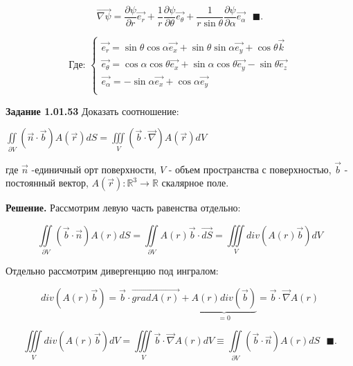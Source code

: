 \documentclass[a4paper, 12pt]{article}
\begin{document}
	\begin{equation}
		\vec{\nabla \psi} = \dfrac{\partial\psi}{\partial r}\vec{e_r} + \dfrac{1}{r}\dfrac{\partial\psi}{\partial\theta}\vec{e_\theta} + \dfrac{1}{r\sin\theta}\dfrac{\partial\psi}{\partial\alpha}\vec{e_\alpha} \text{ } \blacksquare.
	\end{equation}
	
	\begin{equation}
		\text{Где: } \begin{cases}
			\vec{e_r} = \sin\theta\cos\alpha \vec{e_x} + \sin\theta\sin\alpha\vec{e_y} + \cos\theta\vec{k} \\
			\vec{e_\theta} = \cos\alpha\cos\theta\vec{e_x} + \sin\alpha\cos\theta\vec{e_y} -\sin\theta\vec{e_z} \\
			\vec{e_\alpha} =  -\sin\alpha\vec{e_x} + \cos\alpha\vec{e_y} \\
		\end{cases} 
	\end{equation}
		
	\quad \textbf{Задание 1.01.53} Доказать соотношение:
	\newline
	\begin{center}
		$\displaystyle\iint\limits_{\partial V} \left(\vec{n} \cdot \vec{b} \right) A(\vec{r}) dS = \displaystyle\iiint\limits_{V} \left(\vec{b} \cdot \vec{\nabla} \right) A(\vec{r}) dV$
	\end{center}
	
	\quad где $\vec{n}$ -единичный орт поверхности,  $V$ - объем  пространства с поверхностью, $\vec{b}$ - постоянный  вектор, $A(\vec{r}): \mathbb{R}^3 \rightarrow \mathbb{R} $ скалярное поле.
	
	\quad \textbf{Решение. } Рассмотрим левую часть равенства отдельно: 
	
	\begin{equation}
		\displaystyle\iint\limits_{\partial V} \left(\vec{b}\cdot \vec{n}\right) A(r) dS = \displaystyle\iint\limits_{\partial V} A(r)\vec{b} \cdot \vec{dS} = \displaystyle\iiint\limits_{V} div\left(A(r) \vec{b}\right) dV
	\end{equation}
	
	\quad Отдельно рассмотрим дивергенцию под ингралом: 
	
	\begin{equation}
		div\left(A(r)\vec{b}\right) = \vec{b}\cdot \vec{grad A(r)} + \underbrace{A(r)div( \vec{b})}_{=0} =  \vec{b}\cdot \vec{\nabla} A(r)
	\end{equation}
	
	\begin{equation}
		\displaystyle\iiint\limits_{V} div\left(A(r) \vec{b}\right) dV = \displaystyle\iiint\limits_{V} \vec{b}\cdot \vec{\nabla }A(r) dV \equiv \displaystyle\iint\limits_{\partial V} \left(\vec{b}\cdot \vec{n}\right) A(r) dS \text{ } \blacksquare.
	\end{equation}
\end{document}
